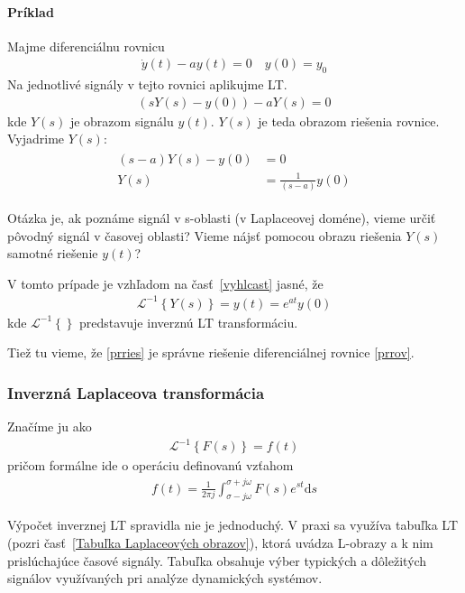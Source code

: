 \documentclass[a4paper, 10pt, ]{article}
\begin{document}
\paragraph{Príklad}

Majme diferenciálnu rovnicu
\begin{align}  \label{prrov}
    \dot y(t) - a y(t) = 0 \quad y(0) = y_0
\end{align}
Na jednotlivé signály v tejto rovnici aplikujme LT.
\begin{align}
    \left( s Y(s) - y(0)  \right) - a Y(s) = 0
\end{align}
kde $Y(s)$ je obrazom signálu $y(t)$. $Y(s)$ je teda obrazom riešenia rovnice. Vyjadrime $Y(s)$:
\begin{align}
    \begin{aligned}
        (s-a)Y(s) - y(0) &= 0 \\
        Y(s) &= \frac{1}{(s-a)} y(0)
    \end{aligned}
\end{align}

Otázka je, ak poznáme signál v s-oblasti (v Laplaceovej doméne), vieme určiť pôvodný signál v časovej oblasti? Vieme nájsť pomocou obrazu riešenia $Y(s)$ samotné riešenie $y(t)$?

V tomto prípade je vzhľadom na časť~\ref{vyhlcast} jasné, že
\begin{align} \label{prries}
    \mathcal L ^{-1} \left\{ Y(s) \right\} = y(t) = e^{at}y(0)
\end{align}
kde $\mathcal L ^{-1} \left\{  \right\}$ predstavuje  inverznú LT transformáciu.

Tiež tu vieme, že \eqref{prries} je správne riešenie diferenciálnej rovnice \eqref{prrov}.

\subsubsection{Inverzná Laplaceova transformácia}

Značíme ju ako
\begin{align}
    \mathcal L ^{-1} \left\{ F(s) \right\} = f(t)
\end{align}
pričom formálne ide o operáciu definovanú vzťahom
\begin{align}
    f(t) = \frac{1}{2\pi j} \int_{\sigma-j\omega}^{\sigma + j\omega} F(s) e^{st} \text{d}s
\end{align}

Výpočet inverznej LT spravidla nie je jednoduchý. V praxi sa využíva tabuľka LT (pozri časť~\ref{Tabuľka Laplaceových obrazov}), ktorá uvádza L-obrazy a k nim prislúchajúce časové signály. Tabuľka obsahuje výber typických a dôležitých signálov využívaných pri analýze dynamických systémov.
\end{document}
